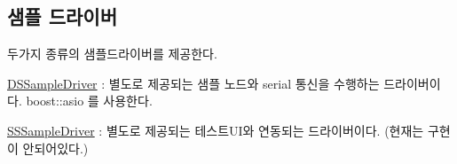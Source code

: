 \subsection*{샘플 드라이버}

두가지 종류의 샘플드라이버를 제공한다.


\begin{DoxyItemize}
\item \hyperlink{classebiodriver_1_1DSSampleDriver}{D\+S\+Sample\+Driver} \+: 별도로 제공되는 샘플 노드와 serial 통신을 수행하는 드라이버이다. boost\+::asio 를 사용한다.
\item \hyperlink{classebiodriver_1_1SSSampleDriver}{S\+S\+Sample\+Driver} \+: 별도로 제공되는 테스트\+U\+I와 연동되는 드라이버이다. (현재는 구현이 안되어있다.) 
\end{DoxyItemize}